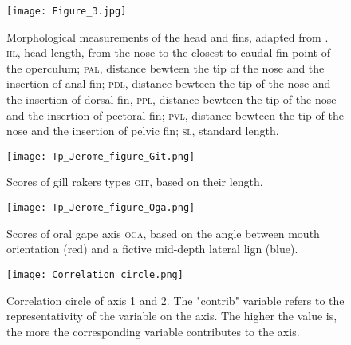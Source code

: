 \begin{figure} [!htbp]
	\begin{center}
		\texttt{[image: Figure\_3.jpg]}
		\caption[Fins morphological measurements]{Morphological measurements of the head and fins, adapted from \citet{keat-chuanng2017,habib2019}. \textsc{hl}, head length, from the nose to the closest-to-caudal-fin point of the operculum; \textsc{pal}, distance bewteen the tip of the nose and the insertion of anal fin; \textsc{pdl}, distance bewteen the tip of the nose and the insertion of dorsal fin, \textsc{ppl}, distance bewteen the tip of the nose and the insertion of pectoral fin; \textsc{pvl}, distance bewteen the tip of the nose and the insertion of pelvic fin;  \textsc{sl}, standard length.}
		\label{fig:fin}
	\end{center}
	
\end{figure}


\begin{figure} [!htbp]
	\begin{center}
	\begin{minipage}{0.45\textwidth}
		\centering
		\texttt{[image: Tp\_Jerome\_figure\_Git.png]}
		\caption[Gill raker types categorical scores]{Scores of gill rakers types \textsc{git}, based on their length.}
		\label{fig:git}
	\end{minipage}\hfill
	\begin{minipage}{0.45\textwidth}
		\centering
		\texttt{[image: Tp\_Jerome\_figure\_Oga.png]}
		\caption[Oral gape axis categorical scores]{Scores of oral gape axis \textsc{oga}, based on the angle between mouth orientation (red) and a fictive mid-depth lateral lign (blue).}
		\label{fig:oga}
	\end{minipage}
	\end{center}
	
\end{figure}

\begin{figure} [!htbp]
	\begin{center}
		\texttt{[image: Correlation\_circle.png]}
	\end{center}
	\caption[FAMD's correlation circle for first and second axis]{Correlation circle of axis 1 and 2. The "contrib" variable refers to the representativity of the variable on the axis. The higher the value is, the more the corresponding variable contributes to the axis.}
	\label{fig:corr_circ_12}
\end{figure}

